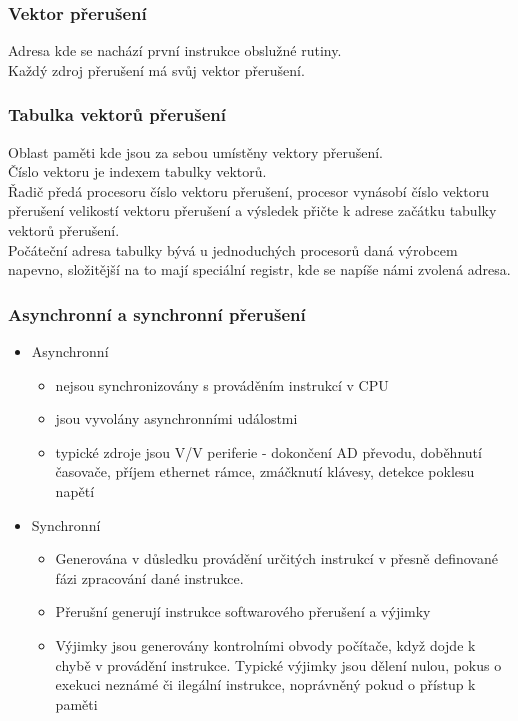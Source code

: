 \subsubsection*{Vektor přerušení}
Adresa kde se nachází první instrukce obslužné rutiny.\\
Každý zdroj přerušení má svůj vektor přerušení.\\

\subsubsection*{Tabulka vektorů přerušení}
Oblast paměti kde jsou za sebou umístěny vektory přerušení.\\
Číslo vektoru je indexem tabulky vektorů.\\
Řadič předá procesoru číslo vektoru přerušení, procesor vynásobí číslo vektoru přerušení velikostí vektoru přerušení a výsledek přičte k adrese začátku tabulky vektorů přerušení.\\
Počáteční adresa tabulky bývá u jednoduchých procesorů daná výrobcem napevno, složitější na to mají speciální registr, kde se napíše námi zvolená adresa.

\subsubsection*{Asynchronní a synchronní přerušení}
\begin{itemize}
    \item Asynchronní
          \begin{itemize}
              \item nejsou synchronizovány s prováděním instrukcí v CPU
              \item jsou vyvolány asynchronními událostmi
              \item typické zdroje jsou V/V periferie - dokončení AD převodu, doběhnutí časovače, příjem ethernet rámce, zmáčknutí klávesy, detekce poklesu napětí
          \end{itemize}
    \item Synchronní
          \begin{itemize}
              \item Generována v důsledku provádění určitých instrukcí v přesně definované fázi zpracování dané instrukce.
              \item Přerušní generují instrukce softwarového přerušení a výjimky
              \item Výjimky jsou generovány kontrolními obvody počítače, když dojde k chybě v provádění instrukce. Typické výjimky jsou dělení nulou, pokus o exekuci neznámé či ilegální instrukce, noprávněný pokud o přístup k paměti
          \end{itemize}
\end{itemize}

